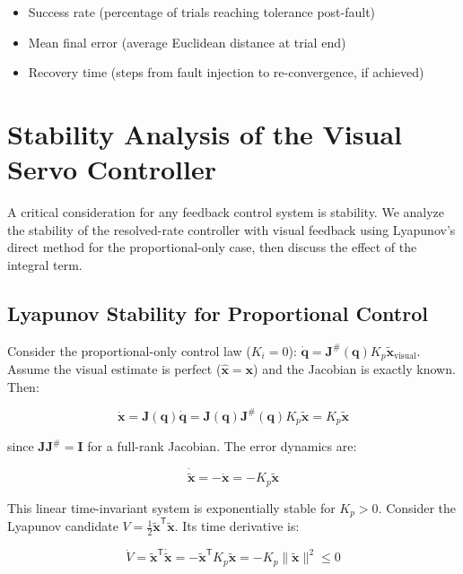 ﻿\documentclass[12pt,a4paper,oneside]{report}
\begin{document}
\begin{itemize}
    \item Success rate (percentage of trials reaching tolerance post-fault)
    \item Mean final error (average Euclidean distance at trial end)
    \item Recovery time (steps from fault injection to re-convergence, if achieved)
\end{itemize}

\section{Stability Analysis of the Visual Servo Controller}

A critical consideration for any feedback control system is stability. We analyze the stability of the resolved-rate controller with visual feedback using Lyapunov's direct method for the proportional-only case, then discuss the effect of the integral term.

\subsection{Lyapunov Stability for Proportional Control}

Consider the proportional-only control law ($K_i = 0$): $\dot{\mathbf{q}} = \mathbf{J}^{\#}(\mathbf{q}) K_p \tilde{\mathbf{x}}_{\text{visual}}$. Assume the visual estimate is perfect ($\hat{\mathbf{x}} = \mathbf{x}$) and the Jacobian is exactly known. Then:

\begin{equation}
\dot{\mathbf{x}} = \mathbf{J}(\mathbf{q}) \dot{\mathbf{q}} = \mathbf{J}(\mathbf{q}) \mathbf{J}^{\#}(\mathbf{q}) K_p \tilde{\mathbf{x}} = K_p \tilde{\mathbf{x}}
\end{equation}

since $\mathbf{J} \mathbf{J}^{\#} = \mathbf{I}$ for a full-rank Jacobian. The error dynamics are:

\begin{equation}
\dot{\tilde{\mathbf{x}}} = -\dot{\mathbf{x}} = -K_p \tilde{\mathbf{x}}
\end{equation}

This linear time-invariant system is exponentially stable for $K_p > 0$. Consider the Lyapunov candidate $V = \frac{1}{2} \tilde{\mathbf{x}}^{\mathsf{T}} \tilde{\mathbf{x}}$. Its time derivative is:

\begin{equation}
\dot{V} = \tilde{\mathbf{x}}^{\mathsf{T}} \dot{\tilde{\mathbf{x}}} = -\tilde{\mathbf{x}}^{\mathsf{T}} K_p \tilde{\mathbf{x}} = -K_p \|\tilde{\mathbf{x}}\|^2 \leq 0
\end{equation}
\end{document}
